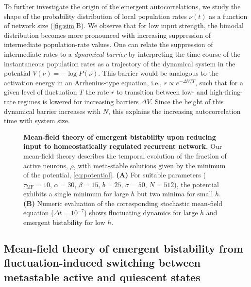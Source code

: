 To further investigate the origin of the emergent autocorrelations, we study the shape of the probability distribution of local population rates $\nu(t)$ as a function of network size (\cref{fig:sim}B).
We observe that for low input strength, the bimodal distribution becomes more pronounced with increasing suppression of intermediate population-rate values.
One can relate the suppression of intermediate rates to a \textit{dynamical barrier} by interpreting the time course of the instantaneous population rates as a trajectory of the dynamical system in the potential $V(\nu) = -\log P(\nu)$.
This barrier would be analogous to the activation energy in an Arrhenius-type equation, i.e., $r\propto e^{-\Delta V/T}$, such that for a given level of fluctuation $T$ the rate $r$ to transition between low- and high-firing-rate regimes is lowered for increasing barriers $\Delta V$.
Since the height of this dynamical barrier increases with $N$, this explains the increasing autocorrelation time with system size.


\begin{figure}[t]
	\caption{%
        \textbf{Mean-field theory of emergent bistability upon reducing input to homeostatically regulated recurrent network.}
        Our mean-field theory describes the temporal evolution of the fraction of active neurons, $\rho$, with meta-stable solutions given by the minimum of the potential, \cref{eq:potential}.
        \textbf{(A)} For suitable parameters ($\tau_\mathrm{MF}=10$, $\alpha=30$, $\beta=15$, $b=25$, $\sigma=50$, $N=512$), the potential exhibits a single minimum for large $h$ but two minima for small $h$.
        \textbf{(B)} Numeric evaluation of the corresponding stochastic mean-field equation ($\Delta t=10^{-7}$) shows fluctuating dynamics for large $h$ and emergent bistability for low $h$.
        }
	\label{fig:theory}
\end{figure}



\subsection{Mean-field theory of emergent bistability from fluctuation-induced switching between metastable active and quiescent states}

